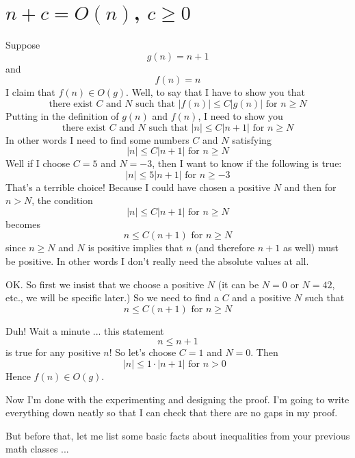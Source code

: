 \section{$n + c = O(n)$, $c \geq 0$} 
Suppose 
\[
g(n) = n + 1
\] 
and 
\[ 
f(n) = n
\] 
I claim that $f(n) \in O(g)$. 
Well, to say that I have to show you that
\[
\text{there exist $C$ and $N$ such that $|f(n)| \leq C|g(n)|$ 
for $n \geq N$}
\]
Putting in the definition of $g(n)$ and $f(n)$, I need to show you
\[
\text{there exist $C$ and $N$ such that $|n| \leq C|n+1|$ 
for $n \geq N$}
\]
In other words I need to find some numbers $C$ and $N$ satisfying
\[
\text{$|n| \leq C|n+1|$ for $n \geq N$}
\]
Well if I choose $C = 5$ and $N = -3$, then I want to know if 
the following is true:
\[
\text{$|n| \leq 5|n+1|$ for $n \geq -3$}
\]
That's a terrible choice! Because I could have chosen a positive $N$ and then for $n > N$, the condition
\[
\text{$|n| \leq C|n+1|$ for $n \geq N$}
\]
becomes
\[
\text{$n \leq C(n+1)$ for $n \geq N$}
\]
since $n \geq N$ and $N$ is positive implies that $n$ (and therefore $n+1$ as 
well) must be positive. In other words I don't really need the absolute values at all.

OK. 
So first we insist that we choose a positive $N$ 
(it can be $N = 0$ or $N = 42$, etc., we will be specific later.) 
So we need to find a $C$ and a positive $N$ such that
\[
\text{$n \leq C(n+1)$ for $n \geq N$}
\]

Duh! Wait a minute ... this statement
\[
\text{$n \leq n+1$}
\]
is true for any positive $n$! So let's choose $C = 1$ and $N = 0$. Then
\[
|n| \leq 1 \cdot |n+1| \text{ for $n > 0$ } 
\]
Hence $f(n) \in O(g)$.

Now I'm done with the experimenting and designing the proof.
I'm going to write everything down neatly so that I can check that there are
no gaps in my proof.

But before that, let me list some basic facts about inequalities
from your previous math classes ...

